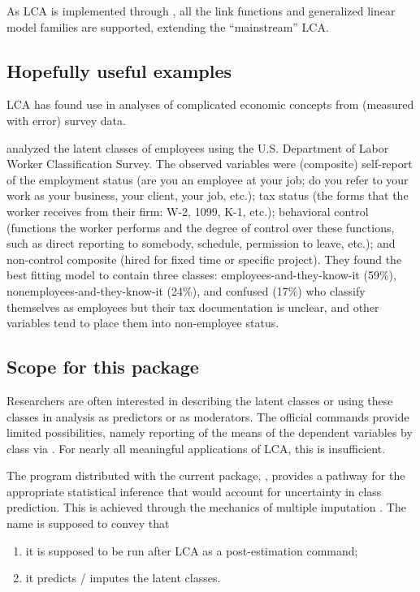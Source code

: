 As LCA is implemented through ,
all the link functions and generalized linear model families
are supported, extending the ``mainstream'' LCA.

\subsection{Hopefully useful examples}

LCA has found use in analyses of complicated economic concepts
from (measured with error) survey data.

\citet{kolenikov:daley:2017} analyzed the latent classes
of employees 
using the U.S. Department of Labor Worker Classification Survey.
The observed variables were (composite) 
self-report of the employment
status (are you an employee at your job; do you refer to your work
as your business, your client, your job, etc.); 
tax status
(the forms that the worker receives from their firm: W-2, 1099, K-1, etc.);
behavioral control 
(functions the worker performs and the degree of control over these functions,
such as direct reporting to somebody, schedule, permission to leave, etc.);
and non-control composite
(hired for fixed time or specific project). They found the best fitting
model to contain three classes: employees-and-they-know-it (59\%),
nonemployees-and-they-know-it (24\%), and confused (17\%) who
classify themselves as employees but their tax documentation
is unclear, and other variables tend to place them into non-employee status.

\subsection{Scope for this package}

Researchers are often interested in describing the latent classes
or using these classes in analysis as predictors or as moderators.
The official  commands provide
limited possibilities, namely reporting of the means
of the dependent variables by class via .
For nearly all meaningful applications of LCA, this is insufficient.

The program distributed with the current package,
, provides a pathway for the appropriate
statistical inference that would account for uncertainty in class prediction.
This is achieved through the mechanics of multiple imputation
\citep{vanbuuren:2018:fimd2}. 
The name is supposed to convey that
\begin{enumerate}
  \item it is supposed to be run after LCA as a post-estimation command;
  \item it predicts / imputes the latent classes.
\end{enumerate}


